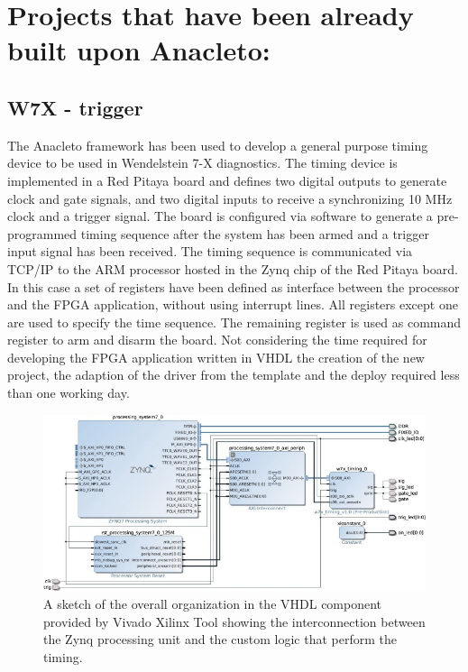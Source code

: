 \section{Projects that have been already built upon Anacleto:}
\subsection{W7X - trigger }
\cite{RIGONI2018122}
The Anacleto framework has been used to develop a general purpose timing device to be used in Wendelstein 7-X diagnostics. The timing device is implemented in a Red Pitaya board and defines two digital outputs to generate clock and gate signals, and two digital inputs to receive a synchronizing 10 MHz clock and a trigger signal. The board is configured via software to generate a pre-programmed timing sequence after the system has been armed and a trigger input signal has been received. The timing sequence is communicated via TCP/IP to the ARM processor hosted in the Zynq chip of the Red Pitaya board. In this case a set of registers have been defined as interface between the processor and the FPGA application, without using interrupt lines. All registers except one are used to specify the time sequence. The remaining register is used as command register to arm and disarm the board. Not considering the time required for developing the FPGA application written in VHDL the creation of the new project, the adaption of the driver from the template and the deploy required less than one working day.

\begin{figure}
    \centering
    \includegraphics{img/APPENDIX/W7X_VHDL.jpg}
    \caption{A sketch of the overall organization in the VHDL component provided by Vivado Xilinx Tool showing the interconnection between the Zynq processing unit and the custom logic that perform the timing. }
    \label{fig:W7X}
\end{figure}



